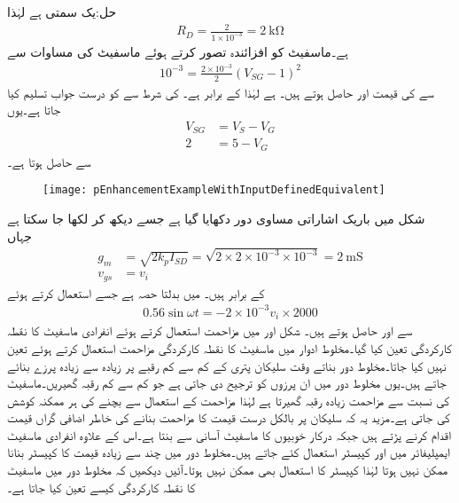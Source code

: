 حل:یک سمتی  ہے لہٰذا
\begin{align*}
R_D=\frac{2}{1 \times 10^{-3}}=\SI{2}{\kilo \ohm}
\end{align*}
ہے۔ماسفیٹ کو افزائندہ تصور کرتے ہوئے ماسفیٹ کی مساوات سے
\begin{align*}
10^{-3}=\frac{2 \times 10^{-3}}{2} \left( V_{SG}-1\right)^2
\end{align*}
سے  کی قیمت  اور  حاصل ہوتے ہیں۔ ہے لہٰذا  کے برابر ہے۔ کی شرط سے  کو درست جواب تسلیم کیا جاتا ہے۔یوں
\begin{align*}
V_{SG} &=V_S-V_G \\
2&=5-V_G
\end{align*}
سے  حاصل ہوتا ہے۔
\begin{figure}
\centering
\texttt{[image: pEnhancementExampleWithInputDefinedEquivalent]}
\caption{}
\label{شکل_ماسفیٹ_جمع_ماسفیٹ_مثال_درکار_مداخل_الف}
\end{figure}
شکل  میں باریک اشاراتی مساوی دور دکھایا گیا ہے جسے دیکھ کر  لکھا جا سکتا ہے جہاں
\begin{align*}
g_m&=\sqrt{2 k_p I_{SD}}=\sqrt{2 \times 2 \times 10^{-3} \times 10^{-3}}=\SI{2}{\milli \siemens}\\
v_{gs}&=v_i
\end{align*}
کے برابر ہیں۔ میں بدلتا حصہ  ہے جسے استعمال کرتے ہوئے
\begin{align*}
0.56 \sin \omega t =-2 \times 10^{-3} v_i \times  2000
\end{align*}
سے  اور  حاصل ہوتے ہیں۔
شکل  اور  میں مزاحمت استعمال کرتے ہوئے انفرادی ماسفیٹ کا نقطہ کارکردگی  تعین کیا گیا۔مخلوط ادوار میں ماسفیٹ کا نقطہ کارکردگی مزاحمت استعمال کرتے ہوئے تعین نہیں کیا جاتا۔مخلوط دور بناتے وقت سلیکان پتری کے کم سے کم رقبے پر زیادہ سے زیادہ پرزے بنائے جاتے ہیں۔یوں مخلوط دور میں ان پرزوں کو ترجیح دی جاتی ہے جو کم سے کم رقبہ گھیریں۔ماسفیٹ کی نسبت سے مزاحمت زیادہ رقبہ گھیرتا ہے لہٰذا مزاحمت کے استعمال سے بچنے کی ہر ممکنہ  کوشش کی جاتی ہے۔مزید یہ کہ سلیکان پر بالکل درست قیمت کا مزاحمت بنانے کی خاطر اضافی گراں قیمت اقدام کرنے پڑتے ہیں جبکہ درکار خوبیوں کا ماسفیٹ آسانی سے  بنتا ہے۔اس کے علاوہ انفرادی ماسفیٹ ایمپلیفائر میں  اور  کپیسٹر استعمال کئے جاتے ہیں۔مخلوط دور میں چند  سے زیادہ قیمت کا کپیسٹر بنانا ممکن نہیں ہوتا لہٰذا کپیسٹر کا استعمال بھی ممکن نہیں ہوتا۔آئیں دیکھیں کہ مخلوط دور میں ماسفیٹ کا نقطہ کارکردگی کیسے تعین کیا جاتا ہے۔
  
